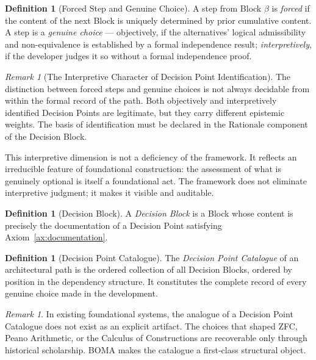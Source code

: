 \documentclass[12pt, a4paper]{article}
\theoremstyle{plain}
\theoremstyle{definition}
\newtheorem{definition}[theorem]{Definition}
\theoremstyle{remark}
\newtheorem{remark}[theorem]{Remark}
\newcommand{\BOMA}{\textsf{BOMA}}
\begin{document}
\begin{definition}[Forced Step and Genuine Choice]
\label{def:genuine-choice}
A step from Block $\beta$ is \emph{forced} if the content of
the next Block is uniquely determined by prior cumulative content.
A step is a \emph{genuine choice} --- objectively, if the
alternatives' logical admissibility and non-equivalence is
established by a formal independence result; \emph{interpretively},
if the developer judges it so without a formal independence proof.
\end{definition}

\begin{remark}[The Interpretive Character of Decision Point Identification]
\label{rem:interpretive}
The distinction between forced steps and genuine choices is not
always decidable from within the formal record of the path. Both
objectively and interpretively identified Decision Points are
legitimate, but they carry different epistemic weights. The basis
of identification must be declared in the
$\mathrm{Rationale}$ component of the Decision Block.

This interpretive dimension is not a deficiency of the framework.
It reflects an irreducible feature of foundational construction:
the assessment of what is genuinely optional is itself a
foundational act. The framework does not eliminate interpretive
judgment; it makes it visible and auditable.
\end{remark}

\begin{definition}[Decision Block]
\label{def:decision-block}
A \emph{Decision Block} is a Block whose content is precisely the
documentation of a Decision Point satisfying
Axiom~\ref{ax:documentation}.
\end{definition}

\begin{definition}[Decision Point Catalogue]
\label{def:catalogue}
The \emph{Decision Point Catalogue} of an architectural path is
the ordered collection of all Decision Blocks, ordered by
position in the dependency structure. It constitutes the
complete record of every genuine choice made in the development.
\end{definition}

\begin{remark}
In existing foundational systems, the analogue of a Decision
Point Catalogue does not exist as an explicit artifact. The
choices that shaped ZFC, Peano Arithmetic, or the Calculus of
Constructions are recoverable only through historical scholarship.
\BOMA{} makes the catalogue a first-class structural object.
\end{remark}
\end{document}

